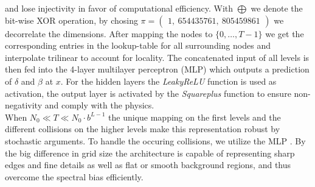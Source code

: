 and lose injectivity in favor of computational efficiency.
With \( \bigoplus \) we denote the bit-wise XOR operation, by chosing \( \pi=\begin{pmatrix} 1, \ 654 435 761, \ 805 459 861 \end{pmatrix}\) we decorrelate the dimensions.
After mapping the nodes to \(  \{0, \ldots, T-1\}   \) we get the corresponding entries in the lookup-table for all surrounding nodes and interpolate trilinear to account for locality.
The concatenated input of all levels is then fed into the 4-layer multilayer perceptron (MLP) which outputs a prediction of \(  \delta  \) and \(  \beta  \) at \( x \).
For the hidden layers the \textit{LeakyReLU} function is used as activation, the output layer is activated by the \textit{Squareplus} function \cite{barronSquareplusSoftplusLikeAlgebraic2021} to ensure non-negativity and comply with the physics. \\
When \( N_0 \ll T \ll N_{0}\cdot b^{L-1} \) the unique mapping on the first levels and the different collisions on the higher levels make this representation robust by stochastic arguments.
To handle the occuring collisions, we utilize the MLP \cite{mullerInstantNeuralGraphics2022}.
By the big difference in grid size the architecture is capable of representing sharp edges and fine details as well as flat or smooth background regions, and thus overcome the spectral bias efficiently.


